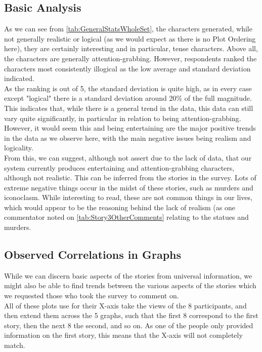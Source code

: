 \documentclass[11pt]{article}
\begin{document}
\subsection{Basic Analysis}
As we can see from \ref{tab:GeneralStatsWholeSet}, the characters generated, while not generally realistic or logical (as we would expect as there is no Plot Ordering here), they are certainly interesting and in particular, tense characters. Above all, the characters are generally attention-grabbing. However, respondents ranked the characters most consistently illogical as the low average and standard deviation indicated. \\

As the ranking is out of 5, the standard deviation is quite high, as in every case except "logical" there is a standard deviation around 20\% of the full magnitude. This indicates that, while there is a general trend in the data, this data can still vary quite significantly, in particular in relation to being attention-grabbing. However, it would seem this and being entertaining are the major positive trends in the data as we observe here, with the main negative issues being realism and logicality.\\

From this, we can suggest, although not assert due to the lack of data, that our system currently produces entertaining and attention-grabbing characters, although not realistic. This can be inferred from the stories in the survey. Lots of extreme negative things occur in the midst of these stories, such as murders and iconoclasm. While interesting to read, these are not common things in our lives, which would appear to be the reasoning behind the lack of realism (as one commentator noted on \ref{tab:Story3OtherComments} relating to the statues and murders.\\


\subsection{Observed Correlations in Graphs}
While we can discern basic aspects of the stories from universal information, we might also be able to find trends between the various aspects of the stories which we requested those who took the survey to comment on.\\

All of these plots use for their X-axis take the views of the 8 participants, and then extend them across the 5 graphs, such that the first 8 correspond to the first story, then the next 8 the second, and so on. As one of the people only provided information on the first story, this means that the X-axis will not completely match.\\
\end{document}
